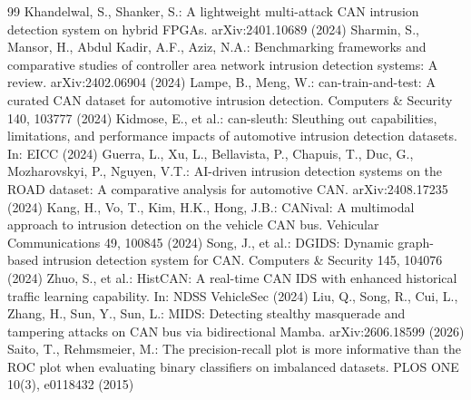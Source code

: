 \documentclass[runningheads]{llncs}
\begin{document}
\begin{thebibliography}{99}
 Khandelwal, S., Shanker, S.: A lightweight multi-attack CAN intrusion detection system on hybrid FPGAs. arXiv:2401.10689 (2024)
 Sharmin, S., Mansor, H., Abdul Kadir, A.F., Aziz, N.A.: Benchmarking frameworks and comparative studies of controller area network intrusion detection systems: A review. arXiv:2402.06904 (2024)
 Lampe, B., Meng, W.: can-train-and-test: A curated CAN dataset for automotive intrusion detection. Computers \& Security 140, 103777 (2024)
 Kidmose, E., et al.: can-sleuth: Sleuthing out capabilities, limitations, and performance impacts of automotive intrusion detection datasets. In: EICC (2024)
 Guerra, L., Xu, L., Bellavista, P., Chapuis, T., Duc, G., Mozharovskyi, P., Nguyen, V.T.: AI-driven intrusion detection systems on the ROAD dataset: A comparative analysis for automotive CAN. arXiv:2408.17235 (2024)
 Kang, H., Vo, T., Kim, H.K., Hong, J.B.: CANival: A multimodal approach to intrusion detection on the vehicle CAN bus. Vehicular Communications 49, 100845 (2024)
 Song, J., et al.: DGIDS: Dynamic graph-based intrusion detection system for CAN. Computers \& Security 145, 104076 (2024)
 Zhuo, S., et al.: HistCAN: A real-time CAN IDS with enhanced historical traffic learning capability. In: NDSS VehicleSec (2024)
 Liu, Q., Song, R., Cui, L., Zhang, H., Sun, Y., Sun, L.: MIDS: Detecting stealthy masquerade and tampering attacks on CAN bus via bidirectional Mamba. arXiv:2606.18599 (2026)
 Saito, T., Rehmsmeier, M.: The precision-recall plot is more informative than the ROC plot when evaluating binary classifiers on imbalanced datasets. PLOS ONE 10(3), e0118432 (2015)
\end{thebibliography}
\endgroup
\end{document}
